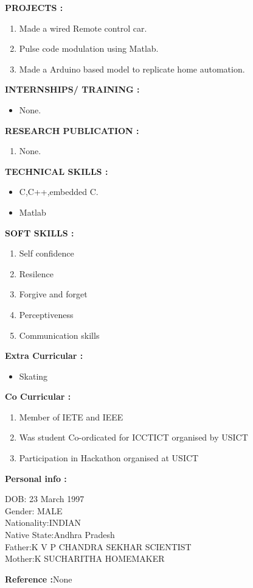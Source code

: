 \documentclass{article}
\begin{document}
	\textbf{PROJECTS :}
	\begin{enumerate}
		\item Made a wired Remote control car.
		\item Pulse code modulation using Matlab.
		\item Made a Arduino based model to replicate home automation.
	\end{enumerate}

	\textbf{INTERNSHIPS/ TRAINING :}
	\begin{itemize}
		\item None.
	\end{itemize}
	
		\textbf{RESEARCH PUBLICATION :}
		\begin{enumerate}
			\item None.
		\end{enumerate}
		
		\newpage
		
			\textbf{TECHNICAL SKILLS :}
			\begin{itemize}	
				\item C,C++,embedded C.
				\item Matlab 
				\end{itemize}
	
	
	\textbf{SOFT SKILLS :}
	\begin{enumerate}
	\item Self confidence 
	\item Resilence
	\item Forgive and forget
	\item Perceptiveness
	\item Communication skills 

	\end{enumerate}
	
	\textbf{Extra Curricular :}
	\begin{itemize}
		\item Skating
		
	\end{itemize}
	
	\textbf{Co Curricular :}
	\begin{enumerate}
		\item Member of IETE and IEEE
		\item Was student Co-ordicated for ICCTICT organised by USICT
		\item Participation in Hackathon organised at USICT
		
		\end{enumerate}
		
\textbf{Personal info :}
		\begin{center}
			DOB: 23 March 1997\\
			Gender: MALE\\
			Nationality:INDIAN\\
			Native State:Andhra Pradesh\\
		    Father:K V P  CHANDRA SEKHAR SCIENTIST\\
	     	Mother:K SUCHARITHA   HOMEMAKER\\
		
		\end{center}

\textbf{Reference :}None 
\end{document}

